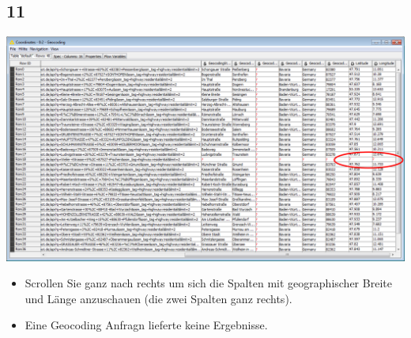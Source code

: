 \documentclass{beamer}
\begin{document}
\subsection{11}
\begin{frame}
	\begin{center}
  		\includegraphics[height=0.6\textheight]{11.png}
	\end{center}
	\begin{itemize}
		\item Scrollen Sie ganz nach rechts um sich die Spalten mit geographischer Breite und Länge anzuschauen (die zwei Spalten ganz rechts).
		\item Eine Geocoding Anfragn lieferte keine Ergebnisse. 
	\end{itemize}
\end{frame}
\end{document}
